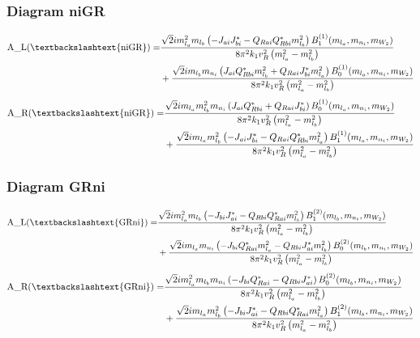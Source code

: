 \documentclass{article}
\begin{document}
\subsubsection{Diagram niGR}
\begin{align*}
\mathtt{\text{A\_L(\textbackslashtext\{niGR\})}} = & \frac{\sqrt{2} i m_{l_a}^{2} m_{l_b} \left(- J_{ai} J_{bi}^* - Q_{Rai} Q_{Rbi}^* m_{l_b}^{2}\right) B^{\left(1\right)}_1(m_{l_a}, m_{n_i}, m_{W_2})}{8 \pi^{2} k_{1} v_{R}^{2} \left(m_{l_a}^{2} - m_{l_b}^{2}\right)} \\
& + \frac{\sqrt{2} i m_{l_b} m_{n_i} \left(J_{ai} Q_{Rbi}^* m_{l_b}^{2} + Q_{Rai} J_{bi}^* m_{l_a}^{2}\right) B^{\left(1\right)}_0(m_{l_a}, m_{n_i}, m_{W_2})}{8 \pi^{2} k_{1} v_{R}^{2} \left(m_{l_a}^{2} - m_{l_b}^{2}\right)} 
\end{align*}
\begin{align*}
\mathtt{\text{A\_R(\textbackslashtext\{niGR\})}} = & \frac{\sqrt{2} i m_{l_a} m_{l_b}^{2} m_{n_i} \left(J_{ai} Q_{Rbi}^* + Q_{Rai} J_{bi}^*\right) B^{\left(1\right)}_0(m_{l_a}, m_{n_i}, m_{W_2})}{8 \pi^{2} k_{1} v_{R}^{2} \left(m_{l_a}^{2} - m_{l_b}^{2}\right)} \\
& + \frac{\sqrt{2} i m_{l_a} m_{l_b}^{2} \left(- J_{ai} J_{bi}^* - Q_{Rai} Q_{Rbi}^* m_{l_a}^{2}\right) B^{\left(1\right)}_1(m_{l_a}, m_{n_i}, m_{W_2})}{8 \pi^{2} k_{1} v_{R}^{2} \left(m_{l_a}^{2} - m_{l_b}^{2}\right)} 
\end{align*}
\subsubsection{Diagram GRni}
\begin{align*}
\mathtt{\text{A\_L(\textbackslashtext\{GRni\})}} = & \frac{\sqrt{2} i m_{l_a}^{2} m_{l_b} \left(- J_{bi} J_{ai}^* - Q_{Rbi} Q_{Rai}^* m_{l_b}^{2}\right) B^{\left(2\right)}_1(m_{l_b}, m_{n_i}, m_{W_2})}{8 \pi^{2} k_{1} v_{R}^{2} \left(m_{l_a}^{2} - m_{l_b}^{2}\right)} \\
& + \frac{\sqrt{2} i m_{l_a} m_{n_i} \left(- J_{bi} Q_{Rai}^* m_{l_a}^{2} - Q_{Rbi} J_{ai}^* m_{l_b}^{2}\right) B^{\left(2\right)}_0(m_{l_b}, m_{n_i}, m_{W_2})}{8 \pi^{2} k_{1} v_{R}^{2} \left(m_{l_a}^{2} - m_{l_b}^{2}\right)} 
\end{align*}
\begin{align*}
\mathtt{\text{A\_R(\textbackslashtext\{GRni\})}} = & \frac{\sqrt{2} i m_{l_a}^{2} m_{l_b} m_{n_i} \left(- J_{bi} Q_{Rai}^* - Q_{Rbi} J_{ai}^*\right) B^{\left(2\right)}_0(m_{l_b}, m_{n_i}, m_{W_2})}{8 \pi^{2} k_{1} v_{R}^{2} \left(m_{l_a}^{2} - m_{l_b}^{2}\right)} \\
& + \frac{\sqrt{2} i m_{l_a} m_{l_b}^{2} \left(- J_{bi} J_{ai}^* - Q_{Rbi} Q_{Rai}^* m_{l_a}^{2}\right) B^{\left(2\right)}_1(m_{l_b}, m_{n_i}, m_{W_2})}{8 \pi^{2} k_{1} v_{R}^{2} \left(m_{l_a}^{2} - m_{l_b}^{2}\right)} 
\end{align*}
\end{document}
